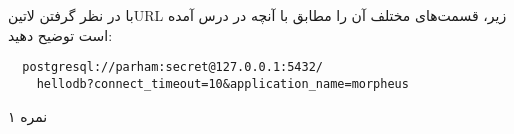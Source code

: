 
با در نظر گرفتن ‌لاتین{URL} زیر، قسمت‌های مختلف آن را مطابق با آنچه در درس آمده است توضیح دهید:

\begin{latin}
\begin{verbatim}
  postgresql://parham:secret@127.0.0.1:5432/
    hellodb?connect_timeout=10&application_name=morpheus
\end{verbatim}
\end{latin}

۱ نمره
